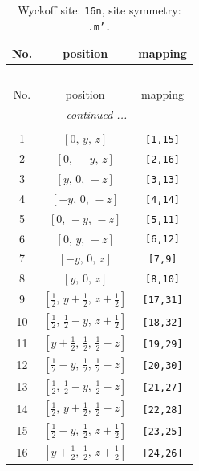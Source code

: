 \documentclass[fleqn,8pt]{jsarticle}
\begin{document}
\renewcommand{\arraystretch}{1.2}
\begin{longtable}{ccc}
\caption{Wyckoff site: {\tt 16n}, site symmetry: {\tt .m'.}}
 \\
 \hline \hline
No. & position & mapping \\ \hline \endfirsthead

\multicolumn{2}{l}{\tablename\ \thetable{}} \\
 \hline \hline
No. & position & mapping \\ \hline \endhead

 \hline \hline
\multicolumn{2}{r}{\footnotesize\it continued ...} \\ \endfoot

 \hline \hline
\multicolumn{2}{r}{} \\ \endlastfoot

1 & $\left[ 0,\, y,\, z \right]$ & {\tt [1,15]} \\ \hline
2 & $\left[ 0,\, - y,\, z \right]$ & {\tt [2,16]} \\ \hline
3 & $\left[ y,\, 0,\, - z \right]$ & {\tt [3,13]} \\ \hline
4 & $\left[ - y,\, 0,\, - z \right]$ & {\tt [4,14]} \\ \hline
5 & $\left[ 0,\, - y,\, - z \right]$ & {\tt [5,11]} \\ \hline
6 & $\left[ 0,\, y,\, - z \right]$ & {\tt [6,12]} \\ \hline
7 & $\left[ - y,\, 0,\, z \right]$ & {\tt [7,9]} \\ \hline
8 & $\left[ y,\, 0,\, z \right]$ & {\tt [8,10]} \\ \hline
9 & $\left[ \frac{1}{2},\, y + \frac{1}{2},\, z + \frac{1}{2} \right]$ & {\tt [17,31]} \\ \hline
10 & $\left[ \frac{1}{2},\, \frac{1}{2} - y,\, z + \frac{1}{2} \right]$ & {\tt [18,32]} \\ \hline
11 & $\left[ y + \frac{1}{2},\, \frac{1}{2},\, \frac{1}{2} - z \right]$ & {\tt [19,29]} \\ \hline
12 & $\left[ \frac{1}{2} - y,\, \frac{1}{2},\, \frac{1}{2} - z \right]$ & {\tt [20,30]} \\ \hline
13 & $\left[ \frac{1}{2},\, \frac{1}{2} - y,\, \frac{1}{2} - z \right]$ & {\tt [21,27]} \\ \hline
14 & $\left[ \frac{1}{2},\, y + \frac{1}{2},\, \frac{1}{2} - z \right]$ & {\tt [22,28]} \\ \hline
15 & $\left[ \frac{1}{2} - y,\, \frac{1}{2},\, z + \frac{1}{2} \right]$ & {\tt [23,25]} \\ \hline
16 & $\left[ y + \frac{1}{2},\, \frac{1}{2},\, z + \frac{1}{2} \right]$ & {\tt [24,26]} \\
\end{longtable}
\end{document}
